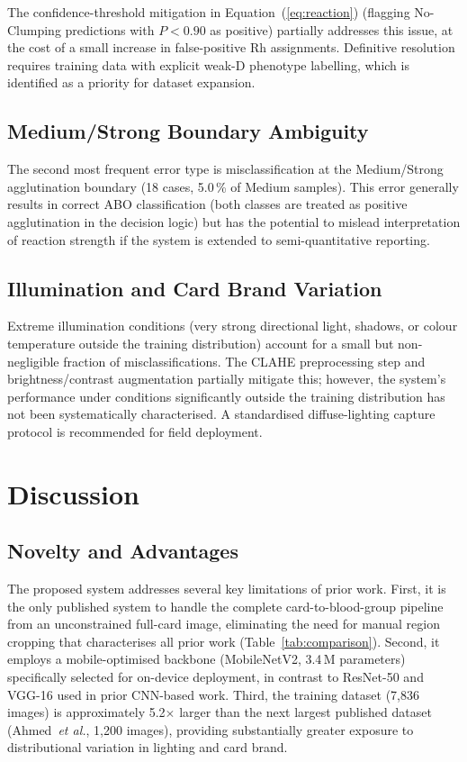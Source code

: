 \documentclass[journal]{IEEEtran}
\begin{document}
The confidence-threshold mitigation in Equation~(\ref{eq:reaction})
(flagging No-Clumping predictions with $P < 0.90$ as positive)
partially addresses this issue, at the cost of a small increase
in false-positive Rh assignments.
Definitive resolution requires training data with explicit
weak-D phenotype labelling, which is identified as a priority for
dataset expansion.

\subsection{Medium/Strong Boundary Ambiguity}

The second most frequent error type is misclassification at the
Medium/Strong agglutination boundary (18 cases, 5.0\,\% of Medium
samples).
This error generally results in correct ABO classification (both
classes are treated as positive agglutination in the decision logic)
but has the potential to mislead interpretation of reaction strength
if the system is extended to semi-quantitative reporting.

\subsection{Illumination and Card Brand Variation}

Extreme illumination conditions (very strong directional light,
shadows, or colour temperature outside the training distribution)
account for a small but non-negligible fraction of misclassifications.
The CLAHE preprocessing step and brightness/contrast augmentation
partially mitigate this; however, the system's performance under
conditions significantly outside the training distribution has not
been systematically characterised.
A standardised diffuse-lighting capture protocol is recommended for
field deployment.

\section{Discussion}
\label{sec:discussion}

\subsection{Novelty and Advantages}

The proposed system addresses several key limitations of prior work.
First, it is the only published system to handle the complete
card-to-blood-group pipeline from an unconstrained full-card image,
eliminating the need for manual region cropping that characterises
all prior work (Table~\ref{tab:comparison}).
Second, it employs a mobile-optimised backbone (MobileNetV2, 3.4\,M
parameters) specifically selected for on-device deployment, in
contrast to ResNet-50 and VGG-16 used in prior CNN-based work.
Third, the training dataset (7,836 images) is approximately 5.2$\times$
larger than the next largest published dataset (Ahmed~\emph{et al.},
1,200 images), providing substantially greater exposure to
distributional variation in lighting and card brand.
\end{document}
